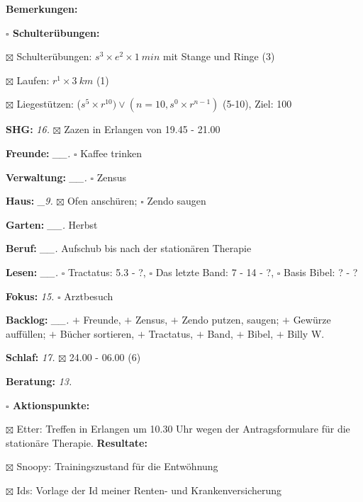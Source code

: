 \documentclass[10pt,a4paper]{article}
\newcommand\prop[1] {{\color {alizarin} {\bf #1}}}        %
\newcommand\opti[1] {{\color {amethyst} {\bf #1}}}        %
\newcommand\mand[1] {{\color {burntorange} {\bf #1}}}     %
\newcommand\topspace{\vskip -15pt \hskip 20pt}
\newcommand\bottomspace{\vskip 4pt}
\newcommand\n[1] { {\sl #1.} \hskip 5pt }
\begin{document}
\begin{mdframed}[style=daystyle]
\begin{labeling}{{\mand {Bemerkungen:}}}
\begin{minipage}{0.75\textwidth}
\begin{labeling}{\prop {$\square$ {Schulterübungen:}}}
      \item[$\boxtimes$ Schulterübungen:] $s^3 \times e^2 \times 1\ min$ mit Stange und Ringe (3)
      \item[$\boxtimes$ Laufen:]          $r^1 \times 3\ km$ (1)
      \item[$\boxtimes$ Liegestützen:]    ($s^5 \times r^{10}) \vee (n=10, s^0 \times r^{n-1})$ (5-10), Ziel: 100
      \end{labeling}
    \end{minipage}
    \bottomspace        
  \item[{\mand {SHG:}}]            \n{16} $\boxtimes$ Zazen in Erlangen von 19.45 - 21.00
  \item[{\mand {Freunde:}}]      \n{\_\_} $\square$ Kaffee trinken
  \item[{\mand {Verwaltung:}}]   \n{\_\_} $\square$ Zensus
  \item[{\mand {Haus:}}]          \n{\_9} $\boxtimes$ Ofen anschüren; $\square$ Zendo saugen
  \item[{\mand {Garten:}}]       \n{\_\_} Herbst
  \item[{\mand {Beruf:}}]        \n{\_\_} Aufschub bis nach der stationären Therapie
  \item[{\mand {Lesen:}}]        \n{\_\_} $\square$ Tractatus: 5.3 - ?,
      $\square$ Das letzte Band: 7 - 14 - ?, $\square$ Basis Bibel: ? - ?
  \item[{\mand {Fokus:}}]          \n{15} $\square$ Arztbesuch
  \item[{\mand {Backlog:}}]      \n{\_\_} $+$ Freunde,
    $+$ Zensus,
    $+$ Zendo putzen, saugen; $+$ Gewürze auffüllen; $+$ Bücher sortieren,
    $+$ Tractatus, $+$ Band, $+$ Bibel, $+$ Billy W.
  \item[{\mand {Schlaf:}}]         \n{17} $\boxtimes$ 24.00 - 06.00 (6)
  \item[{\opti {Beratung:}}]       \n{13} 
    \topspace
    \begin{minipage}{0.75\textwidth}  
      \begin{labeling}{\prop {$\square$ Aktionspunkte:}}
        \setlength\itemsep{-3pt}
      \item[$\boxtimes$ Etter:] Treffen in Erlangen um 10.30 Uhr wegen der
        Antragsformulare für die stationäre Therapie. {\bf Resultate:}
      \item[$\boxtimes$ Snoopy:]        Trainingszustand für die Entwöhnung
      \item[$\boxtimes$ Ids:]           Vorlage der Id meiner Renten- und Krankenversicherung

\end{labeling}
\end{minipage}
\end{labeling}
\end{mdframed}
\end{document}

